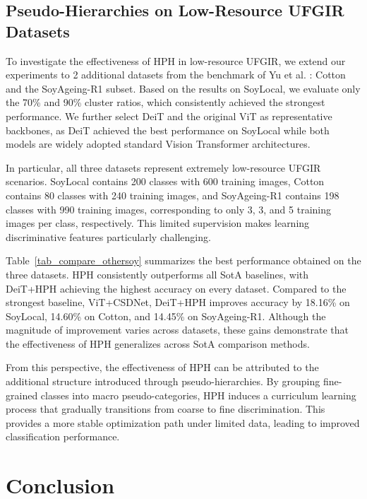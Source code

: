\documentclass[conference,a4paper]{IEEEtran}
\begin{document}
\subsection{Pseudo-Hierarchies on Low-Resource UFGIR Datasets}
To investigate the effectiveness of HPH in low-resource UFGIR, we extend our experiments to 2 additional datasets from the benchmark of Yu et al. \cite{yu_benchmark_2021}: Cotton and the SoyAgeing-R1 subset. Based on the results on SoyLocal, we evaluate only the 70\% and 90\% cluster ratios, which consistently achieved the strongest performance. We further select DeiT and the original ViT as representative backbones, as DeiT achieved the best performance on SoyLocal while both models are widely adopted standard Vision Transformer architectures.

In particular, all three datasets represent extremely low-resource UFGIR scenarios. SoyLocal contains 200 classes with 600 training images, Cotton contains 80 classes with 240 training images, and SoyAgeing-R1 contains 198 classes with 990 training images, corresponding to only 3, 3, and 5 training images per class, respectively. This limited supervision makes learning discriminative features particularly challenging.

Table~\ref{tab_compare_othersoy} summarizes the best performance obtained on the three datasets. HPH consistently outperforms all SotA baselines, with DeiT+HPH achieving the highest accuracy on every dataset. Compared to the strongest baseline, ViT+CSDNet, DeiT+HPH improves accuracy by 18.16\% on SoyLocal, 14.60\% on Cotton, and 14.45\% on SoyAgeing-R1. Although the magnitude of improvement varies across datasets, these gains demonstrate that the effectiveness of HPH generalizes across SotA comparison methods.

From this perspective, the effectiveness of HPH can be attributed to the additional structure introduced through pseudo-hierarchies. By grouping fine-grained classes into macro pseudo-categories, HPH induces a curriculum learning process that gradually transitions from coarse to fine discrimination. This provides a more stable optimization path under limited data, leading to improved classification performance.

\section{Conclusion}
\label{sec_conclusion}
\end{document}
